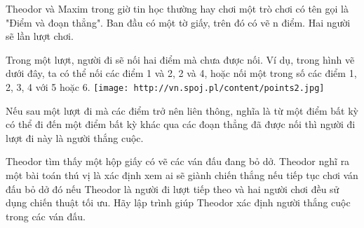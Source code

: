 Theodor và Maxim trong giờ tin học thường hay chơi một trò chơi có tên gọi là "Điểm và đoạn thẳng". Ban đầu có một tờ giấy, trên đó có vẽ n điểm. Hai người sẽ lần lượt chơi.  

   Trong một lượt, người đi sẽ nối hai điểm mà chưa được nối. Ví dụ, trong hình vẽ dưới đây, ta có thể nối các điểm 1 và 2, 2 và 4, hoặc nối một trong số các điểm 1, 2, 3, 4 với 5 hoặc 6.  
\texttt{[image: http://vn.spoj.pl/content/points2.jpg]}

   Nếu sau một lượt đi mà các điểm trở nên liên thông, nghĩa là từ một điểm bất kỳ có thể đi đến một điểm bất kỳ khác qua các đoạn thẳng đã được nối thì người đi lượt đi này là người thắng cuộc.  

   Theodor tìm thấy một hộp giấy có vẽ các ván đấu đang bỏ dở. Theodor nghĩ ra một bài toán thú vị là xác định xem ai sẽ giành chiến thắng nếu tiếp tục chơi ván đấu bỏ dở đó nếu Theodor là người đi lượt tiếp theo và hai người chơi đều sử dụng chiến thuật tối ưu. Hãy lập trình giúp Theodor xác định người thắng cuộc trong các ván đấu.